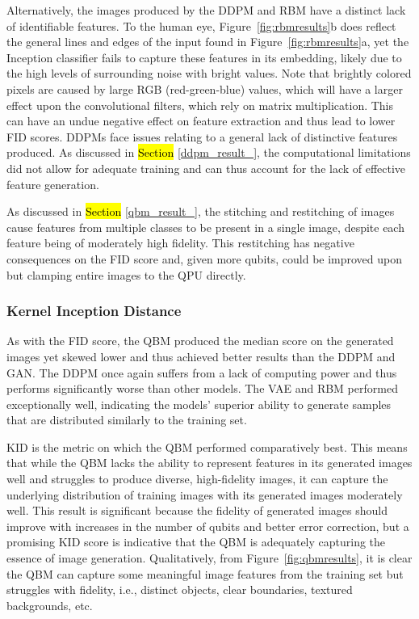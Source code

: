 \documentclass[technologies,article,accept,pdftex,moreauthors]{Definitions/mdpi}
\begin{document}
Alternatively, the images produced by the DDPM and RBM have a distinct lack of identifiable features. To the human eye, Figure~\ref{fig:rbmresults}b does reflect the general lines and edges of the input found in Figure~\ref{fig:rbmresults}a, yet the Inception classifier fails to capture these features in its embedding, likely due to the high levels of surrounding noise with bright values. Note that brightly colored pixels are caused by large RGB (red-green-blue) values, which will have a larger effect upon the convolutional filters, which rely on matrix multiplication. This can have an undue negative effect on feature extraction and thus lead to lower FID scores. DDPMs face issues relating to a general lack of distinctive features produced. As discussed in \hl{Section} \ref{ddpm_result_}, the computational limitations did not allow for adequate training and can thus account for the lack of effective feature generation.


As discussed in \hl{Section} \ref{qbm_result_}, the stitching and restitching of images cause features from multiple classes to be present in a single image, despite each feature being of moderately high fidelity.  This restitching has negative consequences on the FID score and, given more qubits, could be improved upon but clamping entire images to the QPU directly.


\subsubsection{Kernel Inception Distance}
As with the FID score, the QBM produced the median score on the generated images yet skewed lower and thus achieved better results than the DDPM and GAN. The DDPM once again suffers from a lack of computing power and thus performs significantly worse than other models. The VAE and RBM performed exceptionally well, indicating the models' superior ability to generate samples that are distributed similarly to the training set.


KID is the metric on which the QBM performed comparatively best. This means that while the QBM lacks the ability to represent features in its generated images well and struggles to produce diverse, high-fidelity images, it can capture the underlying distribution of training images with its generated images moderately well. This result is significant because the fidelity of generated images should improve with increases in the number of qubits and better error correction, but a promising KID score is indicative that the QBM is adequately capturing the essence of image generation. Qualitatively, from Figure~\ref{fig:qbmresults}, it is clear the QBM can capture some meaningful image features from the training set but struggles with fidelity, i.e., distinct objects, clear boundaries, textured backgrounds, etc.
\end{document}
